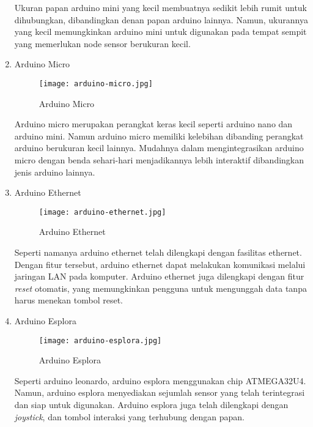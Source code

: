\begin{enumerate}
    Ukuran papan arduino mini yang kecil membuatnya sedikit lebih rumit untuk dihubungkan, dibandingkan denan papan arduino lainnya. Namun, ukurannya yang kecil memungkinkan arduino mini untuk digunakan pada tempat sempit yang memerlukan node sensor berukuran kecil.
    
    \item Arduino Micro
    
    \begin{figure}[H]
    	\centering  
    	\texttt{[image: arduino-micro.jpg]}  
    	\caption[Arduino Micro]{Arduino Micro} 
    	\label{fig:Arduino Micro} 
    \end{figure} 
    
    Arduino micro merupakan perangkat keras kecil seperti arduino nano dan arduino mini. Namun arduino micro memiliki kelebihan dibanding perangkat arduino berukuran kecil lainnya. Mudahnya dalam mengintegrasikan arduino micro dengan benda sehari-hari menjadikannya lebih interaktif dibandingkan jenis arduino lainnya.
    
    \item Arduino Ethernet
    
    \begin{figure}[H]
    	\centering  
    	\texttt{[image: arduino-ethernet.jpg]} 
    	\caption[Arduino Ethernet]{Arduino Ethernet} 
    	\label{fig:Arduino Ethernet} 
    \end{figure} 
    
    Seperti namanya arduino ethernet telah dilengkapi dengan fasilitas ethernet. Dengan fitur tersebut, arduino ethernet dapat melakukan komunikasi melalui jaringan LAN pada komputer. Arduino ethernet juga dilengkapi dengan fitur \textit{reset} otomatis, yang memungkinkan pengguna untuk mengunggah  data tanpa harus menekan tombol reset.
    
    \item Arduino Esplora
    
    \begin{figure}[H]
    	\centering  
    	\texttt{[image: arduino-esplora.jpg]}  
    	\caption[Arduino Esplora]{Arduino Esplora} 
    	\label{fig:Arduino Esplora} 
    \end{figure} 
    
    Seperti arduino leonardo, arduino esplora menggunakan chip ATMEGA32U4. Namun, arduino esplora menyediakan sejumlah sensor yang telah terintegrasi dan siap untuk digunakan. Arduino esplora juga telah dilengkapi dengan \textit{joystick}, dan tombol interaksi yang terhubung dengan papan.
\end{enumerate}

